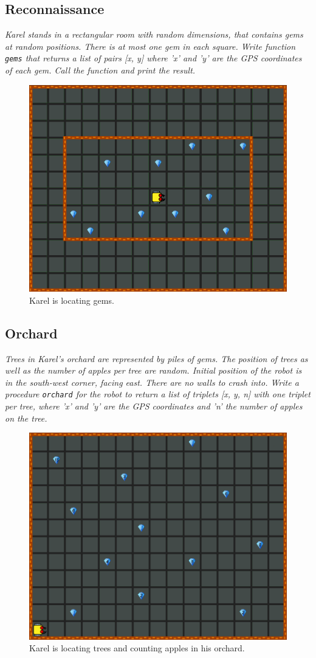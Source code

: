 {{\subsection{Reconnaissance}

{\em Karel stands in a rectangular room with random dimensions, that contains gems at random positions. There is at most one gem in each square. Write function {\tt gems}  that returns a list of pairs [x, y] where 'x' and 'y' are the GPS coordinates of each gem. Call the function and print the result.}

\begin{figure}[!ht]
\begin{center}
\includegraphics[height=0.4\textwidth]{img/h02b.png}
\end{center}
\vspace{-4mm}
\caption{Karel is locating gems.}
\label{fig:h02b}
\end{figure}



\subsection{Orchard}

{\em Trees in Karel's orchard are represented by piles of gems. The position of trees as well as the number of apples per tree are random. Initial position of the robot is in the south-west corner, facing east. There are no walls to crash into. Write a procedure {\tt orchard} for the robot to return a list of triplets [x, y, n] with one triplet per tree, where 'x' and 'y' are the GPS coordinates and 'n' the number of apples on the tree.}

\newpage

\begin{figure}[!ht]
\begin{center}
\includegraphics[height=0.4\textwidth]{img/h03.png}
\end{center}
\vspace{-4mm}
\caption{Karel is locating trees and counting apples in his orchard.}
\label{fig:h03}
\end{figure}


}}
